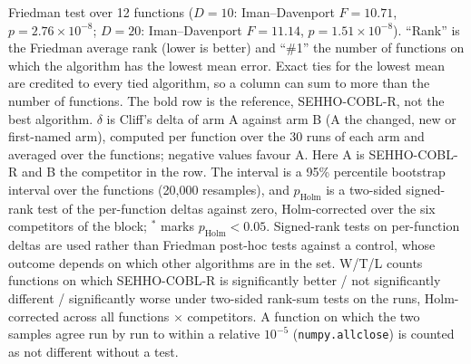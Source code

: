 \begin{table}[htbp]
\begin{flushleft}
Friedman test over 12 functions ($D=10$: Iman--Davenport $F=10.71$, $p=2.76\times10^{-8}$; $D=20$: Iman--Davenport $F=11.14$, $p=1.51\times10^{-8}$). ``Rank'' is the Friedman average rank (lower is better) and ``\#1'' the number of functions on which the algorithm has the lowest mean error. Exact ties for the lowest mean are credited to every tied algorithm, so a column can sum to more than the number of functions. The bold row is the reference, SEHHO-COBL-R, not the best algorithm. $\delta$ is Cliff's delta of arm A against arm B (A the changed, new or first-named arm), computed per function over the 30 runs of each arm and averaged over the functions; negative values favour A. Here A is SEHHO-COBL-R and B the competitor in the row. The interval is a 95\% percentile bootstrap interval over the functions (20{,}000 resamples), and $p_{\text{Holm}}$ is a two-sided signed-rank test of the per-function deltas against zero, Holm-corrected over the six competitors of the block; $^{*}$ marks $p_{\text{Holm}}<0.05$. Signed-rank tests on per-function deltas are used rather than Friedman post-hoc tests against a control, whose outcome depends on which other algorithms are in the set. W/T/L counts functions on which SEHHO-COBL-R is significantly better / not significantly different / significantly worse under two-sided rank-sum tests on the runs, Holm-corrected across all functions $\times$ competitors. A function on which the two samples agree run by run to within a relative $10^{-5}$ (\texttt{numpy.allclose}) is counted as not different without a test.
\end{flushleft}
\end{table}
